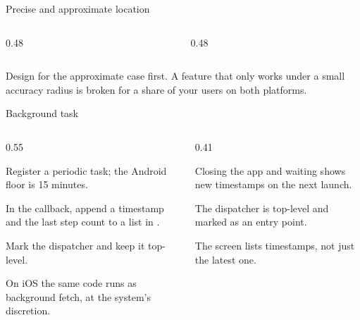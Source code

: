 \documentclass[10pt,aspectratio=169,t]{beamer}
\begin{document}
\begin{frame}[eyebrow=Task II]{Precise and approximate location}
  \vskip 2mm
  \begin{columns}[T]
    \begin{column}{0.48\textwidth}
    \end{column}
    \begin{column}{0.48\textwidth}
    \end{column}
  \end{columns}
  \begin{takeaway}{Design for the approximate case first.}
    A feature that only works under a small accuracy radius is broken for a share of your users on both platforms.
  \end{takeaway}
\end{frame}

\begin{frame}[eyebrow=Task III]{Background task}
  \begin{columns}[T]
    \begin{column}{0.55\textwidth}
      \begin{steps}
        \item Register a periodic task; the Android floor is 15 minutes.
        \item In the callback, append a timestamp and the last step count to a list in .
        \item Mark the dispatcher  and keep it top-level.
        \item On iOS the same code runs as background fetch, at the system's discretion.
      \end{steps}
    \end{column}
    \begin{column}{0.41\textwidth}
      \begin{checklist}
        \item Closing the app and waiting shows new timestamps on the next launch.
        \item The dispatcher is top-level and marked as an entry point.
        \item The screen lists timestamps, not just the latest one.
      \end{checklist}
    \end{column}
  \end{columns}
\end{frame}
\end{document}

